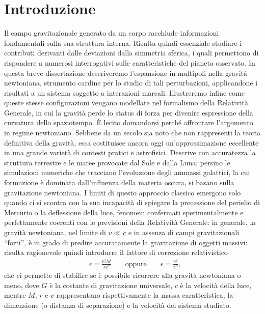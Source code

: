 \chapter{Introduzione}
Il campo gravitazionale generato da un corpo racchiude informazioni fondamentali sulla sua struttura interna. Risulta quindi essenziale studiare i contributi derivanti dalle deviazioni dalla simmetria sferica, i quali permettono di rispondere a numerosi interrogativi sulle caratteristiche del pianeta osservato. 
In questa breve dissertazione descriveremo l'espansione in multipoli nella gravità newtoniana, strumento cardine per lo studio di tali perturbazioni, applicandone i risultati a un sistema soggetto a interazioni mareali. Illustreremo infine come queste stesse configurazioni vengano modellate nel formalismo della Relatività Generale, in cui la gravità perde lo status di forza per divenire espressione della curvatura dello spaziotempo.
È lecito domandarsi perché affrontare l'argomento in regime newtoniano. Sebbene da un secolo sia noto che non rappresenti la teoria definitiva della gravità, essa costituisce ancora oggi un'approssimazione eccellente in una grande varietà di contesti pratici e astrofisici. Descrive con accuratezza la struttura terrestre e le maree provocate dal Sole e dalla Luna; persino le simulazioni numeriche che tracciano l'evoluzione degli ammassi galattici, la cui formazione è dominata dall'influenza della materia oscura, si basano sulla gravitazione newtoniana. I limiti di questo approccio classico emergono solo quando ci si scontra con la sua incapacità di spiegare la precessione del perielio di Mercurio o la deflessione della luce, fenomeni confermati sperimentalmente e perfettamente coerenti con le previsioni della Relatività Generale: in generale, la gravità newtoniana, nel limite di $v \ll c$ e in assenza di campi gravitazionali ``forti'', è in grado di predire accuratamente la gravitazione di oggetti massivi: risulta ragionevole quindi introdurre il fattore di correzione relativistico
\begin{align}
	&\epsilon = \frac{GM}{rc^2} & &\text{ oppure } & &\epsilon = \frac{v^2}{c^2},
\end{align}
che ci permette di stabilire se è possibile ricorrere alla gravità newtoniana o meno, dove $G$ è la costante di gravitazione universale, $c$ è la velocità della luce, mentre $M$, $r$ e $v$ rappresentano rispettivamente la massa caratteristica, la dimensione (o distanza di separazione) e la velocità del sistema studiato.
